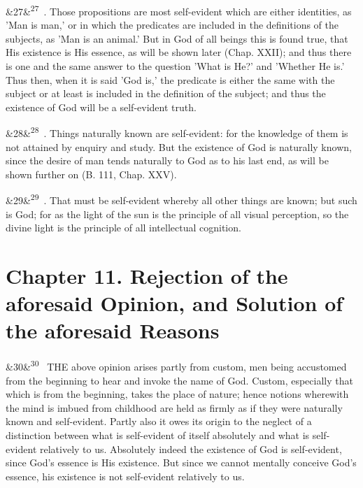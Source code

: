 \documentclass[12pt]{article}
\newcommand{\para}[1][]{\par\noindent\ifx&#1&\else\textsuperscript{\footnotesize #1}~\fi}
\begin{document}
\para[27] 3. Those propositions are most self-evident which are either identities, as 'Man is man,' or in which the predicates are included in the definitions of the subjects, as 'Man is an animal.' But in God of all beings this is found true, that His existence is His essence, as will be shown later (Chap. XXII); and thus there is one and the same answer to the question 'What is He?' and 'Whether He is.' Thus then, when it is said 'God is,' the predicate is either the same with the subject or at least is included in the definition of the subject; and thus the existence of God will be a self-evident truth.

\para[28] 4. Things naturally known are self-evident: for the knowledge of them is not attained by enquiry and study. But the existence of God is naturally known, since the desire of man tends naturally to God as to his last end, as will be shown further on (B. 111, Chap. XXV).

\para[29] 5. That must be self-evident whereby all other things are known; but such is God; for as the light of the sun is the principle of all visual perception, so the divine light is the principle of all intellectual cognition.

\section*{Chapter 11. Rejection of the aforesaid Opinion, and Solution of the aforesaid Reasons}

\para[30] THE above opinion arises partly from custom, men being accustomed from the beginning to hear and invoke the name of God. Custom, especially that which is from the beginning, takes the place of nature; hence notions wherewith the mind is imbued from childhood are held as firmly as if they were naturally known and self-evident. Partly also it owes its origin to the neglect of a distinction between what is self-evident of itself absolutely and what is self-evident relatively to us. Absolutely indeed the existence of God is self-evident, since God's essence is His existence. But since we cannot mentally conceive God's essence, his existence is not self-evident relatively to us.
\end{document}
